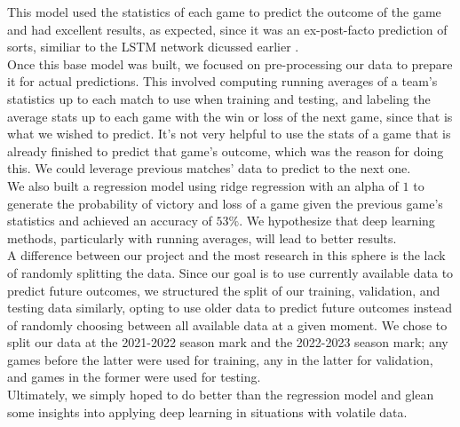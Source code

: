 \documentclass[10pt,twocolumn,letterpaper]{article}
\begin{document}
This model used the statistics of each game to predict the outcome of the game and had excellent results, as expected, since it was an ex-post-facto prediction of sorts, similiar to the LSTM network dicussed earlier \cite{Pettersson}. \\

Once this base model was built, we focused on pre-processing our data to prepare it for actual predictions. This involved computing running averages of a team's statistics up to each match to use when training and testing, and labeling the average stats up to each game with the win or loss of the next game, since that is what we wished to predict. It's not very helpful to use the stats of a game that is already finished to predict that game's outcome, which was the reason for doing this. We could leverage previous matches' data to predict to the next one. \\

We also built a regression model using ridge regression with an alpha of $1$ to generate the probability of victory and loss of a game given the previous game's statistics and achieved an accuracy of $53\%$. We hypothesize that deep learning methods, particularly with running averages, will lead to better results. \\

A difference between our project and the most research in this sphere
is the lack of randomly splitting the data. Since our goal is to use
currently available data to predict future outcomes, we structured the split of our
training, validation, and testing data similarly, opting to use older
data to predict future outcomes instead of randomly choosing between
all available data at a given moment. We chose to split our data at the 2021-2022 season mark and the 2022-2023 season mark; any games before the latter were used for training, any in the latter for validation, and games in the former were used for testing. \\

Ultimately, we simply hoped to do better than the regression model and glean some insights into applying deep learning in situations with volatile data. \\

\end{document}
